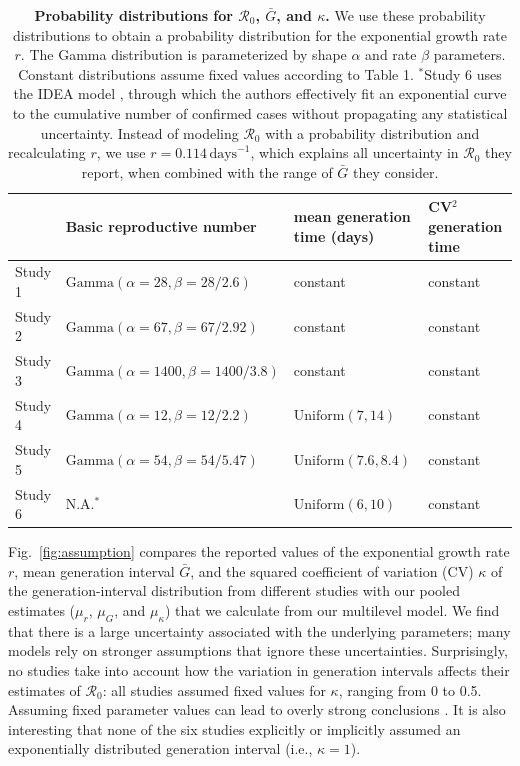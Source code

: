 \documentclass[12pt]{article}
\newcommand{\fref}[1]{Fig.~\ref{fig:#1}}
\newcommand{\Rx}[1]{\ensuremath{{\mathcal R}_{#1}}}
\newcommand{\Ro}{\Rx{0}\xspace}
\begin{document}
\newcommand{\gammdist}{\mathrm{Gamma}}
\begin{table}[t]
\begin{center}
\footnotesize
\begin{tabular}{l|l|l|l}
 & Basic reproductive number & mean generation time (days) & CV$^2$ generation time \\
\hline
Study 1 & $\gammdist(\alpha=28, \beta=28/2.6)$ & constant & constant \\
\hline
Study 2 & $\gammdist(\alpha=67, \beta=67/2.92)$ & constant & constant \\
\hline
Study 3 & $\gammdist(\alpha=1400, \beta=1400/3.8)$ & constant & constant \\
\hline
Study 4 & $\gammdist(\alpha=12, \beta=12/2.2)$ & $\mathrm{Uniform}(7, 14)$ & constant\\
\hline
Study 5 & $\gammdist(\alpha=54, \beta=54/5.47)$ & $\mathrm{Uniform}(7.6, 8.4)$ & constant\\
\hline
Study 6 & N.A.$^\ast$ & $\mathrm{Uniform}(6, 10)$ & constant\\
\hline
\end{tabular}
\end{center}
\caption{
\textbf{Probability distributions for \Ro, $\bar G$, and $\kappa$.}
We use these probability distributions to obtain a probability distribution for the exponential growth rate $r$.
The Gamma distribution is parameterized by shape $\alpha$ and rate $\beta$ parameters.
Constant distributions assume fixed values according to Table 1.
$^\ast$Study 6 uses the IDEA model \citep{fisman2013idea}, through which the authors effectively fit an exponential curve to the cumulative number of confirmed cases without propagating any statistical uncertainty.
Instead of modeling \Ro with a probability distribution and recalculating $r$, we use $r=0.114\,\mathrm{days}^{-1}$, which explains all uncertainty in \Ro they report, when combined with the range of $\bar G$ they consider.
}
\end{table}

\fref{assumption} compares the reported values of the exponential growth rate $r$, mean generation interval $\bar G$, and the squared coefficient of variation (CV) $\kappa$ of the generation-interval distribution from different studies with our pooled estimates ($\mu_r$, $\mu_G$, and $\mu_\kappa$) that we calculate from our multilevel model.
We find that there is a large uncertainty associated with the underlying parameters;
many models rely on stronger assumptions that ignore these uncertainties.
Surprisingly, no studies take into account how the variation in generation intervals affects their estimates of \Ro:
all studies assumed fixed values for $\kappa$, ranging from 0 to 0.5.
Assuming fixed parameter values can lead to overly strong conclusions \citep{elderd2006uncertainty}.
It is also interesting that none of the six studies explicitly or implicitly assumed an exponentially distributed generation interval (i.e., $\kappa=1$).
\end{document}
